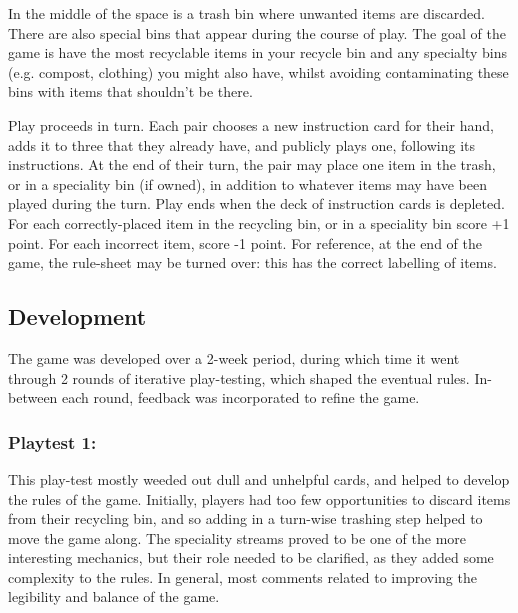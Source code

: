 \documentclass[nofonts,nols,justified,nobib]{tufte-book}
\begin{document}
In the middle of the space is a trash bin where unwanted items are discarded. There are also special bins that appear during the course of play. 
The goal of the game is have the most recyclable items in your recycle bin and any specialty bins (e.g. compost, clothing) you might also have, whilst avoiding contaminating these bins with items that shouldn't be there. 

Play proceeds in turn. Each pair chooses a new instruction card for their hand, adds it to three that they already have, and publicly plays one, following its instructions. At the end of their turn, the pair may place one item in the trash, or in a speciality bin (if owned), in addition to whatever items may have been played during the turn. 
Play ends when the deck of instruction cards is depleted. For each correctly-placed item in the recycling bin, or in a speciality bin score +1 point. For each incorrect item, score -1 point. For reference, at the end of the game, the rule-sheet may be turned over: this has the correct labelling of items. 


\subsection*{Development}

The game was developed over a 2-week period, during which time it went through 2 rounds of iterative play-testing, which shaped the eventual rules. In-between each round, feedback was incorporated to refine the game.

\subsubsection*{Playtest 1:}
This play-test mostly weeded out dull and unhelpful cards, and helped to develop the rules of the game. Initially, players had too few opportunities to discard items from their recycling bin, and so adding in a turn-wise trashing step helped to move the game along. The speciality streams proved to be one of the more interesting mechanics, but their role needed to be clarified, as they added some complexity to the rules. In general, most comments related to improving the legibility and balance of the game.
\end{document}
